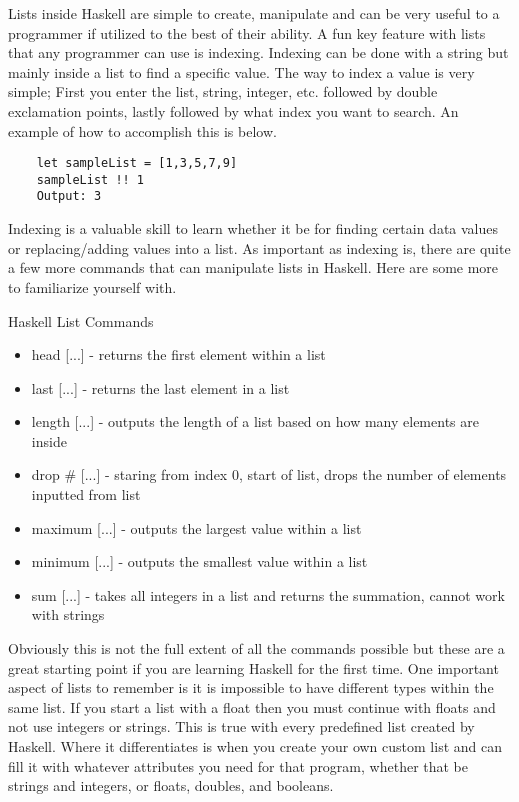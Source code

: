 \documentclass{article}
\begin{document}
    Lists inside Haskell are simple to create, manipulate and can be very useful to a programmer if utilized to the best of their ability. A fun key feature with lists that any programmer can use is indexing. Indexing can be done with a string but mainly inside a list to find a specific value. The way to index a value is very simple; First you enter the list, string, integer, etc. followed by double exclamation points, lastly followed by what index you want to search. An example of how to accomplish this is below. 
    
    \begin{lstlisting}
    let sampleList = [1,3,5,7,9]
    sampleList !! 1
    Output: 3
    \end{lstlisting}
    
    Indexing is a valuable skill to learn whether it be for finding certain data values or replacing/adding values into a list. As important as indexing is, there are quite a few more commands that can manipulate lists in Haskell. Here are some more to familiarize yourself with.
    
    \clearpage
    \caption{Haskell List Commands}
    \begin{itemize}
              \item head [...] - returns the first element within a list
              \item last [...] - returns the last element in a list
              \item length [...] - outputs the length of a list based on how many elements are inside
              \item drop # [...] - staring from index 0, start of list, drops the number of elements inputted from list
              \item maximum [...] - outputs the largest value within a list
              \item minimum [...] - outputs the smallest value within a list
              \item sum [...] - takes all integers in a list and returns the summation, cannot work with strings
    \end{itemize}
    
    \medskip
    \noindent Obviously this is not the full extent of all the commands possible but these are a great starting point if you are learning Haskell for the first time. One important aspect of lists to remember is it is impossible to have different types within the same list. If you start a list with a float then you must continue with floats and not use integers or strings. This is true with every predefined list created by Haskell. Where it differentiates is when you create your own custom list and can fill it with whatever attributes you need for that program, whether that be strings and integers, or floats, doubles, and booleans. 
\end{document}
